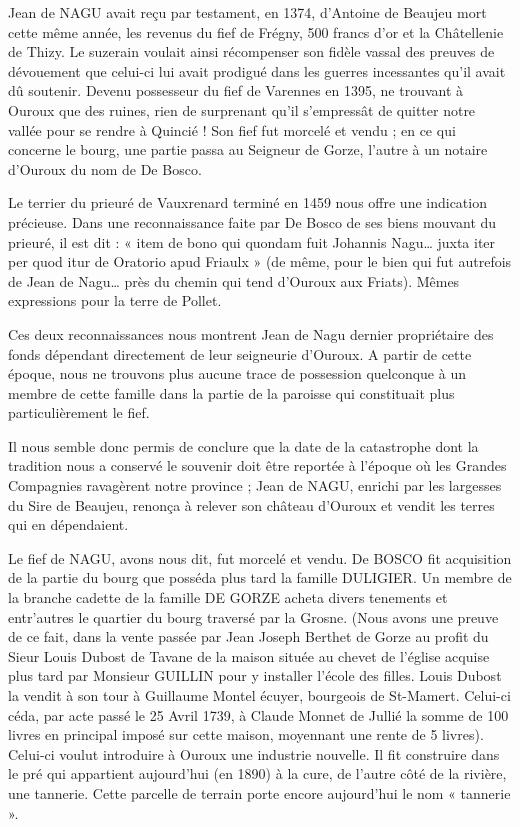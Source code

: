 Jean de NAGU avait reçu par testament, en 1374, d'Antoine de Beaujeu mort cette même année, les revenus du fief de Frégny, 500 francs d'or et la Châtellenie de Thizy. Le suzerain voulait ainsi récompenser son fidèle vassal des preuves de dévouement que celui-ci lui avait prodigué dans les guerres incessantes qu'il avait dû soutenir. Devenu possesseur du fief de Varennes en 1395, ne trouvant à Ouroux que des ruines, rien de surprenant qu'il s'empressât de quitter notre vallée pour se rendre à Quincié ! Son fief fut morcelé et
vendu ; en ce qui concerne le bourg, une partie passa au Seigneur de Gorze, l'autre à un notaire d'Ouroux du nom de De Bosco.

Le terrier du prieuré de Vauxrenard terminé en 1459 nous offre une indication précieuse. Dans une reconnaissance faite par De Bosco de ses biens mouvant du prieuré, il est dit : « item de bono qui quondam fuit Johannis Nagu… juxta iter per quod itur de Oratorio apud Friaulx » (de même, pour le bien qui fut autrefois de Jean de Nagu… près du chemin qui tend d'Ouroux aux Friats). Mêmes expressions pour la terre de Pollet.

Ces deux reconnaissances nous montrent Jean de Nagu dernier propriétaire des fonds dépendant directement de leur seigneurie d'Ouroux. A partir de cette époque, nous ne trouvons plus aucune trace de possession quelconque à un membre de cette famille dans la partie de la paroisse qui constituait plus particulièrement le fief.

Il nous semble donc permis de conclure que la date de la catastrophe dont la tradition nous a conservé le souvenir doit être reportée à l'époque où les Grandes Compagnies ravagèrent notre province ; Jean de NAGU, enrichi par les largesses du Sire de Beaujeu, renonça à relever son château d'Ouroux et vendit les terres qui en dépendaient.

Le fief de NAGU, avons nous dit, fut morcelé et vendu. De BOSCO fit acquisition de la partie du bourg que posséda plus tard la famille DULIGIER. Un membre de la branche cadette de la famille DE GORZE acheta divers tenements et entr'autres le quartier du bourg traversé par la Grosne. (Nous avons une preuve de ce fait, dans la vente passée par Jean Joseph Berthet de Gorze au profit du Sieur Louis Dubost de Tavane de la maison située au chevet de l'église acquise plus tard par Monsieur GUILLIN pour y installer l'école des filles. Louis Dubost la vendit à son tour à Guillaume Montel écuyer, bourgeois de St-Mamert. Celui-ci céda, par acte passé le 25 Avril 1739, à Claude Monnet de Jullié la somme de 100 livres en principal imposé sur cette maison, moyennant une rente de 5 livres). Celui-ci voulut introduire à Ouroux une industrie nouvelle. Il fit construire dans le pré qui appartient aujourd'hui (en 1890) à la cure, de l'autre côté de la rivière, une tannerie. Cette parcelle de terrain porte encore aujourd'hui le nom « tannerie ».

